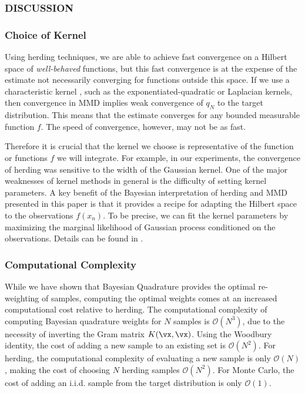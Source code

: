 \subsubsection{DISCUSSION}

\subsubsection{Choice of Kernel}

Using herding techniques, we are able to achieve fast convergence on a Hilbert space of \emph{well-behaved} functions, but this fast convergence is at the expense of the estimate not necessarily converging for functions outside this space.
If we use a characteristic kernel \citep{Sriperumbudur2010}, such as the exponentiated-quadratic or Laplacian kernels, then convergence in MMD implies weak convergence of $q_N$ to the target distribution. 
This means that the estimate converges for any bounded measurable function $f$. The speed of convergence, however, may not be as fast.

Therefore it is crucial that the kernel we choose is representative of the function or functions $f$ we will integrate.  For example, in our experiments, the convergence of herding was sensitive to the width of the Gaussian kernel.  One of the major weaknesses of kernel methods in general is the difficulty of setting kernel parameters.  A key benefit of the Bayesian interpretation of herding and MMD presented in this paper is that it provides a recipe for adapting the Hilbert space to the observations $f(x_n)$.  To be precise, we can fit the kernel parameters by maximizing the marginal likelihood of Gaussian process conditioned on the observations.  Details can be found in \citep{rasmussen38gaussian}.

\subsubsection{Computational Complexity}

While we have shown that Bayesian Quadrature provides the optimal re-weighting of samples, computing the optimal weights comes at an increased computational cost relative to herding. 
%
The computational complexity of computing Bayesian quadrature weights for $N$ samples is $\mathcal{O}(N^3)$, due to the necessity of inverting the Gram matrix $K(\vx, \vx)$.  Using the Woodbury identity, the cost of adding a new sample to an existing set is $\mathcal{O}(N^2)$.  For herding, the computational complexity of evaluating a new sample is only $\mathcal{O}(N)$, making the cost of choosing $N$ herding samples $\mathcal{O}(N^2)$.  For Monte Carlo, the cost of adding an i.i.d. sample from the target distribution is only $\mathcal{O}(1)$.

